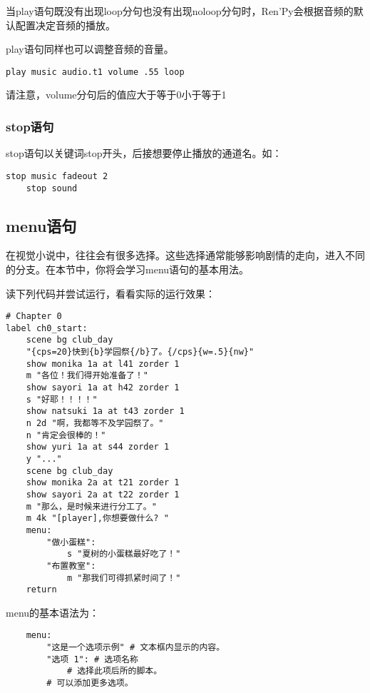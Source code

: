 \begin{ExtraKnowledge}
    当play语句既没有出现loop分句也没有出现noloop分句时，Ren'Py会根据音频的默认配置决定音频的播放。
\end{ExtraKnowledge}

play语句同样也可以调整音频的音量。
\begin{lstlisting}[numbers=none]
    play music audio.t1 volume .55 loop
\end{lstlisting}
请注意，volume分句后的值应大于等于0小于等于1

\subsubsection{stop语句}

stop语句以关键词stop开头，后接想要停止播放的通道名。如：
\begin{lstlisting}[]
    stop music fadeout 2
    stop sound
\end{lstlisting}

\subsection{menu语句}
在视觉小说中，往往会有很多选择。这些选择通常能够影响剧情的走向，进入不同的分支。在本节中，你将会学习menu语句的基本用法。

读下列代码并尝试运行，看看实际的运行效果：
\begin{lstlisting}[caption=script-ch1.rpy]
# Chapter 0
label ch0_start:
    scene bg club_day
    "{cps=20}快到{b}学园祭{/b}了。{/cps}{w=.5}{nw}"
    show monika 1a at l41 zorder 1
    m "各位！我们得开始准备了！"
    show sayori 1a at h42 zorder 1
    s "好耶！！！！"
    show natsuki 1a at t43 zorder 1
    n 2d "啊，我都等不及学园祭了。"
    n "肯定会很棒的！"
    show yuri 1a at s44 zorder 1
    y "..."
    scene bg club_day
    show monika 2a at t21 zorder 1
    show sayori 2a at t22 zorder 1
    m "那么，是时候来进行分工了。"
    m 4k "[player],你想要做什么? "
    menu:
        "做小蛋糕":
            s "夏树的小蛋糕最好吃了！"
        "布置教室":
            m "那我们可得抓紧时间了！"
    return
\end{lstlisting}

menu的基本语法为：
\begin{lstlisting}
    menu:
        "这是一个选项示例" # 文本框内显示的内容。
        "选项 1": # 选项名称
            # 选择此项后所的脚本。
        # 可以添加更多选项。
\end{lstlisting}
